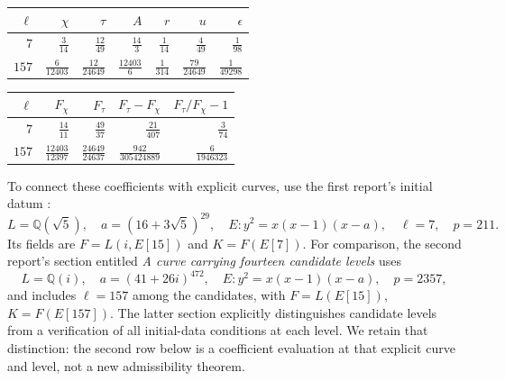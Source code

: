 \documentclass[11pt]{article}
\theoremstyle{remark}
\begin{document}
\begin{center}\small\renewcommand{\arraystretch}{1.8}\everymath{\displaystyle}
\begin{tabular}{rrrrrrr}
\toprule
$\ell$ & $\chi$ & $\tau$ & $A$ & $r$ & $u$ & $\epsilon$\\
\midrule
$7$ & $\frac{3}{14}$ & $\frac{12}{49}$ & $\frac{14}{3}$ & $\frac{1}{14}$ & $\frac{4}{49}$ & $\frac{1}{98}$ \\
$157$ & $\frac{6}{12403}$ & $\frac{12}{24649}$ & $\frac{12403}{6}$ & $\frac{1}{314}$ & $\frac{79}{24649}$ & $\frac{1}{49298}$ \\
\bottomrule
\end{tabular}
\end{center}

\begin{center}\small\renewcommand{\arraystretch}{1.8}\everymath{\displaystyle}
\begin{tabular}{rrrrr}
\toprule
$\ell$ & $F_\chi$ & $F_\tau$ & $F_\tau-F_\chi$ & $F_\tau/F_\chi-1$\\
\midrule
$7$ & $\frac{14}{11}$ & $\frac{49}{37}$ & $\frac{21}{407}$ & $\frac{3}{74}$ \\
$157$ & $\frac{12403}{12397}$ & $\frac{24649}{24637}$ & $\frac{942}{305424889}$ & $\frac{6}{1946323}$ \\
\bottomrule
\end{tabular}
\end{center}

To connect these coefficients with explicit curves, use the first report's
initial datum \cite[Thm.~1 and the arithmetic conditions]{First}:
\[
 L=\mathbb Q(\sqrt5),\quad a=(16+3\sqrt5)^{29},\quad
 E:y^2=x(x-1)(x-a),\quad\ell=7,\quad p=211.
\]
Its fields are $F=L(i,E[15])$ and $K=F(E[7])$.
For comparison, the second report's section entitled
\emph{A curve carrying fourteen candidate levels} \cite[\S13]{Second} uses
\[
 L=\mathbb Q(i),\quad a=(41+26i)^{472},\quad
 E:y^2=x(x-1)(x-a),\quad p=2357,
\]
and includes $\ell=157$ among the candidates, with
$F=L(E[15])$, $K=F(E[157])$.
The latter section explicitly distinguishes candidate levels from a
verification of all initial-data conditions at each level.
We retain that distinction: the second row below is a coefficient
evaluation at that explicit curve and level, not a new admissibility theorem.
\end{document}
